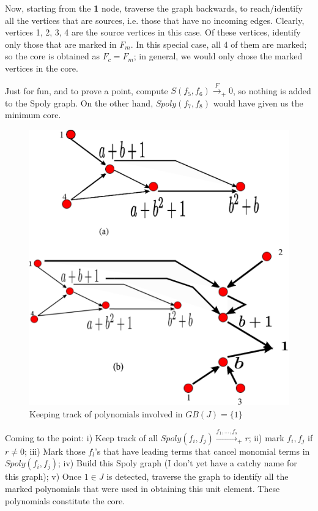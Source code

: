 \begin{Example}
\item Now, starting from the \textbf{1} node, traverse the graph
  backwards, to reach/identify all the vertices that are sources,
  i.e. those that have no incoming edges. Clearly, vertices 1, 2, 3, 4
  are the source vertices in this case. Of these vertices, identify
  only those that are marked in $F_m$. In this special case, all 4 of
  them are marked; so the core is obtained as $F_c = F_m$; in general, 
  we would only chose the marked vertices in the core. 

\item Just for fun, and to prove a point, compute $S(f_5, f_6)
  \xrightarrow{F}_+0$, so nothing is added to the Spoly graph. On the
  other hand, $Spoly(f_7, f_8)$ would have given us the   minimum
  core. 
\een

\end{Example}



\begin{figure}[hbt]
\centering
\includegraphics[scale=0.6]{trace.eps}
\caption{Keeping track of polynomials involved in $GB(J) = \{1\}$}
\label{fig:trace}
\end{figure}

Coming to the point: i) Keep track of all $Spoly(f_i,
f_j)\xrightarrow{f_1, \dots, f_s}_+ r$; ii) mark $f_i, f_j$ if $r\neq
0$; iii) Mark those $f_l$'s that have leading terms that cancel
monomial terms in $Spoly(f_i, f_j)$; iv) Build this Spoly graph (I
don't yet have a catchy name for this graph); v) Once $1\in J$ is
detected, traverse the graph to identify all the marked polynomials that were
used in obtaining this unit element. These polynomials constitute the
core.


